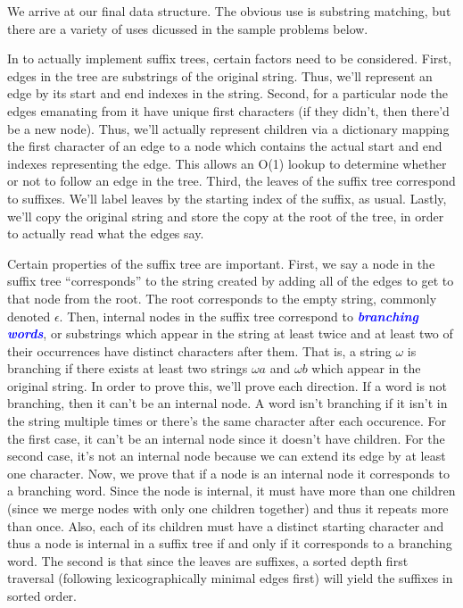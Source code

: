 \documentclass[11pt, oneside]{article}
\newcommand{\emphasis}[1]{\textcolor{blue}{\textbf{\textit{#1}}}}
\begin{document}
We arrive at our final data structure. The obvious use is substring matching,
but there are a variety of uses dicussed in the sample problems below.

In to actually implement suffix trees, certain factors need to be considered.
First, edges in the tree are substrings of the original string.
Thus, we'll represent an edge by its start and end indexes in the string.
Second, for a particular node the edges emanating from it have unique first characters
(if they didn't, then there'd be a new node).
Thus, we'll actually represent children via a dictionary mapping the first character
of an edge to a node which contains the actual start and end indexes representing the edge.
This allows an O(1) lookup to determine whether or not to follow an edge in the tree.
Third, the leaves of the suffix tree correspond to suffixes.
We'll label leaves by the starting index of the suffix, as usual.
Lastly, we'll copy the original string and store the copy at the root of the tree,
in order to actually read what the edges say.

Certain properties of the suffix tree are important.
First, we say a node in the suffix tree ``corresponds'' to the string created by adding all of the edges to get to that node from the root.
The root corresponds to the empty string, commonly denoted \( \epsilon \).
Then, internal nodes in the suffix tree correspond to \emphasis{branching words},
or substrings which appear in the string at least twice and at least two of their occurrences have distinct characters after them.
That is, a string \( \omega \) is branching if there exists at least two strings \( \omega a \) and \( \omega b \) which appear in the original string.
In order to prove this, we'll prove each direction. If a word is not branching, then it can't be an internal node.
A word isn't branching if it isn't in the string multiple times or there's the same character after each occurence.
For the first case, it can't be an internal node since it doesn't have children.
For the second case, it's not an internal node because we can extend its edge by at least one character.
Now, we prove that if a node is an internal node it corresponds to a branching word.
Since the node is internal, it must have more than one children (since we merge nodes with only one children together)
and thus it repeats more than once. Also, each of its children must have a distinct starting character
and thus a node is internal in a suffix tree if and only if it corresponds to a branching word.
The second is that since the leaves are suffixes, a sorted depth first traversal
(following lexicographically minimal edges first) will yield the suffixes in sorted order.
\end{document}
